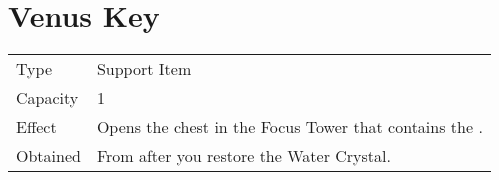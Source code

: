\section{Venus Key}
\label{item:venus_key}


\noindent\begin{tabularx}{\textwidth}[l]{lX}
	Type
	& Support Item
\\ %
	Capacity
	& 1
\\ %
	Effect
	& Opens the chest in the Focus Tower that contains the \nameref{armor:venus_shield}.
\\ %
	Obtained
	& From \nameref{char:spencer} after you restore the Water Crystal.
\end{tabularx}
